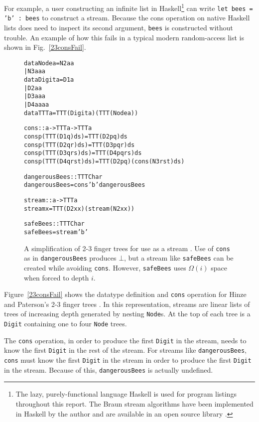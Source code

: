 \documentclass[envcountsect]{llncs}
\begin{document}
For example, a user constructing an infinite list in 
Haskell\footnote{The lazy, purely-functional language Haskell \cite{haskellReport} is used for program listings throughout this report.
The Braun stream algorithms have been implemented in Haskell by the author and are available in an open source library \cite{website}. } 
can write {\tt let bees = 'b' : bees} to construct a stream.
Because the cons operation on native Haskell lists does need to inspect its second argument, {\tt bees} is constructed without trouble.
An example of how this fails in a typical modern random-access list is shown in Fig.~\ref{23consFail}.

\begin{figure}
\begin{alltt}
data Node a = N2 a a
            | N3 a a a
data Digit a = D1 a
             | D2 a a
             | D3 a a a
             | D4 a a a a
data TTT a = TTT (Digit a) (TTT (Node a))

cons :: a -> TTT a -> TTT a
cons p (TTT (D1 q)       ds) = TTT (D2 p q) ds
cons p (TTT (D2 q r)     ds) = TTT (D3 p q r) ds
cons p (TTT (D3 q r s)   ds) = TTT (D4 p q r s) ds
cons p (TTT (D4 q r s t) ds) = TTT (D2 p q) (cons (N3 r s t) ds)

dangerousBees :: TTT Char
dangerousBees = cons 'b' dangerousBees

stream :: a -> TTT a
stream x = TTT (D2 x x) (stream (N2 x x))

safeBees :: TTT Char
safeBees = stream 'b'
\end{alltt}
\caption{
A simplification of 2-3 finger trees for use as a stream \cite{HinzePat}. 
Use of {\tt cons} as in {\tt dangerousBees} produces $\bot$, but a stream like {\tt safeBees} can be created while avoiding {\tt cons}.
However, {\tt safeBees} uses $\Omega(i)$ space when forced to depth $i$.
}
\label{23consFail}
\label{23stream}
\end{figure}

Figure~\ref{23consFail} shows the datatype definition and {\tt cons} operation for Hinze and Paterson's 2-3 finger trees \cite{HinzePat}.
In this representation, streams are linear lists of trees of increasing depth generated by nesting {\tt Node}s.
At the top of each tree is a {\tt Digit} containing one to four {\tt Node} trees.

The {\tt cons} operation, in order to produce the first {\tt Digit} in the stream, needs to know the first {\tt Digit} in the rest of the stream.
For streams like {\tt dangerousBees}, {\tt cons} must know the first {\tt Digit} in the stream in order to produce the first {\tt Digit} in the stream.
Because of this, {\tt dangerousBees} is actually undefined.
\end{document}
